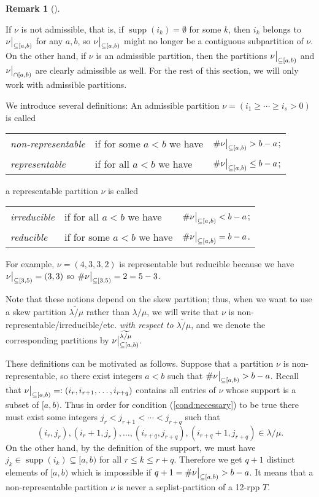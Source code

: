\documentclass[numbers=enddot,12pt,final,onecolumn,notitlepage]{scrartcl}%
\theoremstyle{definition}
\newtheorem{remk}[theo]{Remark}
\newenvironment{remark}[1][]
{\begin{remk}[#1]\begin{leftbar}}
{\end{leftbar}\end{remk}}
\def\seplistvar{{{\nu}}} %
\def\supp{{\operatorname{supp}}}
\def\lm{{\lambda/\mu}}
\begin{document}
\begin{remark}
 If $\seplistvar$ is not admissible, that is, if $\supp(i_k)=\emptyset$ for some $k$, then $i_k$ belongs to $\nuab$ for any $a,b$, so $\nuab$ might no longer be a contiguous subpartition of $\seplistvar$. On the other hand, if $\seplistvar$ is an admissible partition, then the partitions $\nuab$ and $\nuabcap$ are clearly admissible as well. For the rest of this section, we will only work with admissible partitions.
\end{remark}


We introduce several definitions: An admissible partition $\seplistvar=(i_1\geq \cdots\geq i_s>0)$ is called

\begin{tabular}{@{$\bullet$ }lll}
 \textit{non-representable} & if for some $a<b$ we have & $\#\nuab>b-a$;\\
 \textit{representable}& if for all $a<b$ we have& $\#\nuab\leq b-a$;\\
\end{tabular}

a representable partition $\seplistvar$ is called

\begin{tabular}{@{$\bullet$ }lll} 
 \textit{irreducible}& if for all  $a<b$ we have &$\#\nuab < b-a$;\\
 \textit{reducible} &if for some $a<b$ we have &$\#\nuab=b-a$.
\end{tabular}

For example, $\seplistvar=(4,3,3,2)$ is representable but reducible because we have $\nuxy{3}{5}=(3,3)$ so $\#\nuxy{3}{5}=2=5-3$.

Note that these notions depend on the skew partition; thus, when we want to use a skew partition $\widetilde\lm$ rather than $\lm$, we will write that $\seplistvar$ is non-representable/irreducible/etc. \textit{with respect to $\widetilde\lm$}, and we denote the corresponding partitions by $\nuab^{\widetilde{\lm}}$.

These definitions can be motivated as follows. Suppose that a partition $\seplistvar$ is non-representable, so there exist integers $a<b$ such that $\#\nuab>b-a$. Recall that $\nuab=:(i_r,i_{r+1},\dots,i_{r+q})$ contains all entries of $\seplistvar$ whose support is a subset of $[a,b)$. Thus in order for condition (\ref{cond:necessary}) to be true there must exist some integers $j_r<j_{r+1}<\cdots<j_{r+q}$ such that 
$$(i_r, j_r),(i_r+1, j_r),\dots,(i_{r+q},j_{r+q}),(i_{r+q}+1,j_{r+q})\in\lm.$$
On the other hand, by the definition of the support, we must have $j_k\in \supp(i_k)\subseteq [a,b)$ for all $r\leq k\leq r+q$. Therefore we get $q+1$ distinct elements of $[a,b)$ which is impossible if $q+1=\#\nuab>b-a$. It means that a non-representable partition $\seplistvar$ is never a seplist-partition of a 12-rpp $T$. 
\end{document}
